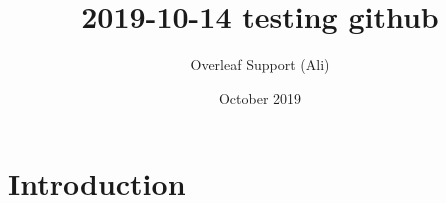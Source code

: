 \documentclass{article}
\title{2019-10-14 testing github}
\author{Overleaf Support (Ali) }
\date{October 2019}
\begin{document}
\maketitle

\section{Introduction}
\end{document}
